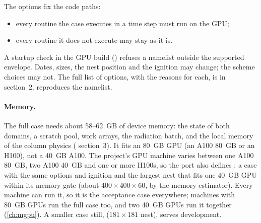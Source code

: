The options fix the code paths:
\begin{itemize}
  \item every routine the case executes in a time step must run on the GPU;
  \item every routine it does not execute may stay as it is.
\end{itemize}
A startup check in the GPU build () refuses a namelist outside the supported envelope. Dates,
sizes, the nest position and the ignition may change; the scheme choices may not. The full list of options, with the
reasons for each, is in  section~2.  reproduces the namelist.

\paragraph{Memory.} The full case needs about 58--62~GB of device memory: the state of both domains, a scratch pool,
work arrays, the radiation batch, and the local memory of the column physics ( section~3). It fits an
80~GB GPU (an A100 80~GB or an H100), not a 40~GB A100. The project's GPU machine varies between one A100 80~GB, two
A100 40~GB and one or more H100s, so the port also defines : a case with the same options and
ignition and the largest nest that fits one 40~GB GPU within its memory gate (about $400 \times 400 \times 60$, by
the memory estimator). Every machine can run it, so it is the acceptance case everywhere; machines with 80~GB GPUs
run the full case too, and two 40~GB GPUs run it together (\cref{ch:mgpu}). A smaller case still,
 ($181 \times 181$ nest), serves development.
